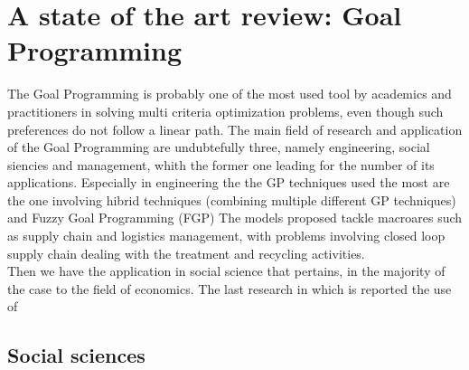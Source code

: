 \documentclass{article}
\begin{document}
\pagebreak 

\section{A state of the art review: Goal Programming}
The Goal Programming is probably one of the most used tool by academics and practitioners in solving multi criteria optimization problems, even though such preferences do not follow a linear path\cite{Romero2014}\cite{Schniederjans1995}. The main field of research and application of the Goal Programming are undubtefully three, namely engineering, social siencies and management\cite{colapinto_multi-criteria_2017}, whith the former one leading for the number of its applications.
Especially in engineering the the GP techniques used the most are the one involving hibrid techniques (combining multiple different GP techniques) and Fuzzy Goal Programming (FGP) The models proposed tackle macroares such as supply chain and logistics management, with problems involving closed loop supply chain dealing with the treatment and recycling activities\cite{Inserirezarandi}. 
\\
Then we have the application in social science that pertains, in the majority of the case to the field of economics. The last research in which is reported the use of 

\subsection{Social sciences}
\end{document}
